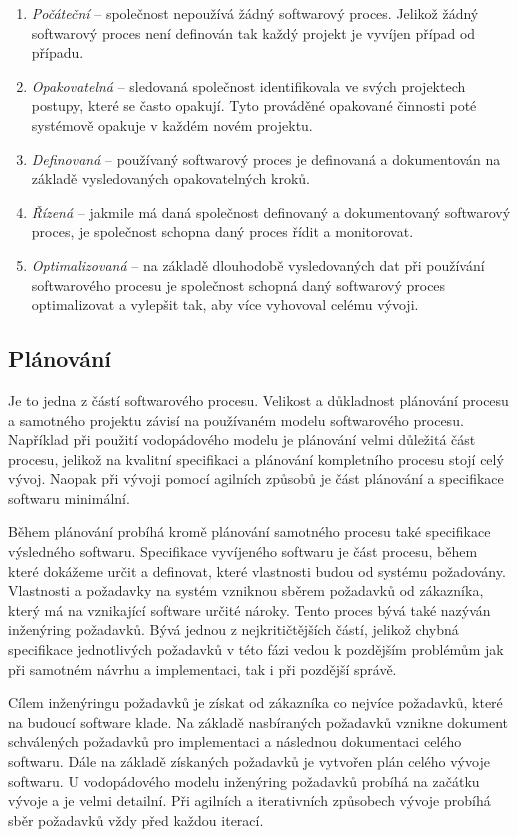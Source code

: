 \documentclass[czech,master,public,dept460,male,cpdeclaration,oneside]{diploma}
\begin{document}
\begin{enumerate}
\item \textit{Počáteční} -- společnost nepoužívá žádný softwarový proces. Jelikož žádný softwarový proces není definován tak každý projekt je vyvíjen případ od případu.
\item \textit{Opakovatelná} -- sledovaná společnost identifikovala ve svých projektech postupy, které se často opakují. Tyto prováděné opakované činnosti poté systémově opakuje v každém novém projektu.
\item \textit{Definovaná} -- používaný softwarový proces je definovaná a dokumentován na základě vysledovaných opakovatelných kroků.
\item \textit{Řízená} -- jakmile má daná společnost definovaný a dokumentovaný softwarový proces, je společnost schopna daný proces řídit a monitorovat. 
\item \textit{Optimalizovaná} -- na základě dlouhodobě vysledovaných dat při používání softwarového procesu je společnost schopná daný softwarový proces optimalizovat a vylepšit tak, aby více vyhovoval celému vývoji.
\end{enumerate}


\subsection{Plánování}
Je to jedna z částí softwarového procesu. Velikost a důkladnost plánování procesu a samotného projektu závisí na používaném modelu softwarového procesu. Například při použití vodopádového modelu je plánování velmi důležitá část procesu, jelikož na kvalitní specifikaci a plánování kompletního procesu stojí celý vývoj. Naopak při vývoji pomocí agilních způsobů je část plánování a specifikace softwaru minimální. 

Během plánování probíhá kromě plánování samotného procesu také specifikace výsledného softwaru. Specifikace vyvíjeného softwaru je část procesu, během které dokážeme určit a definovat, které vlastnosti budou od systému požadovány. Vlastnosti a požadavky na systém vzniknou sběrem požadavků od zákazníka, který má na vznikající software určité nároky. Tento proces bývá také nazýván inženýring požadavků. Bývá jednou z nejkritičtějších částí, jelikož chybná specifikace jednotlivých požadavků v této fázi vedou k pozdějším problémům jak při samotném návrhu a implementaci, tak i při pozdější správě.

Cílem inženýringu požadavků je získat od zákazníka co nejvíce požadavků, které na budoucí software klade. Na základě nasbíraných požadavků vznikne dokument schválených požadavků pro  implementaci a následnou dokumentaci celého softwaru. Dále na základě získaných požadavků je vytvořen plán celého vývoje softwaru. U vodopádového modelu inženýring požadavků probíhá na začátku vývoje a je velmi detailní. Při agilních a iterativních způsobech vývoje probíhá sběr požadavků vždy před každou iterací.
\end{document}
